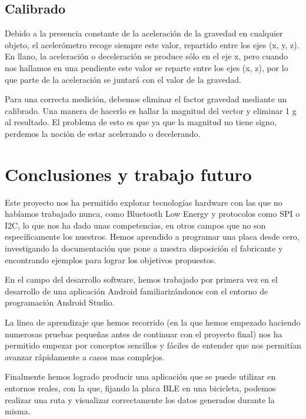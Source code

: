 

\section{Calibrado}

Debido a la presencia constante de la aceleración de la gravedad en cualquier objeto, el acelerómetro recoge siempre este valor, repartido entre los ejes (x, y, z). En llano, la aceleración o deceleración se produce sólo en el eje x, pero cuando nos hallamos en una pendiente este valor se reparte entre los ejes (x, z), por lo que parte de la aceleración se juntará con el valor de la gravedad.

Para una correcta medición, debemos eliminar el factor gravedad mediante un calibrado. Una manera de hacerlo es hallar la magnitud del vector y eliminar 1 g al resultado. El problema de esto es que ya que la magnitud no tiene signo, perdemos la noción de estar acelerando o decelerando.

\cleardoublepage

\chapter{Conclusiones y trabajo futuro}
\label{makereference8}

Este proyecto nos ha permitido explorar tecnologías hardware con las que no habíamos trabajado nunca, como Bluetooth Low Energy y protocolos como SPI o I2C, lo que nos ha dado unas competencias, en otros campos que no son específicamente los nuestros. Hemos aprendido a programar una placa desde cero, investigando la documentación que pone a nuestra disposición el fabricante y encontrando ejemplos para lograr los objetivos propuestos.

En el campo del desarrollo software, hemos trabajado por primera vez en el desarrollo de una aplicación Android familiarizándonos con el entorno de programación Android Studio.

La línea de aprendizaje que hemos recorrido (en la que hemos empezado haciendo numerosas pruebas pequeñas antes de continuar con el proyecto final) nos ha permitido empezar por conceptos sencillos y fáciles de entender que nos permitían avanzar rápidamente a casos mas complejos.

Finalmente hemos logrado producir una aplicación que se puede utilizar en entornos reales, con la que, fijando la placa BLE en una bicicleta, podemos realizar una ruta y visualizar correctamente los datos generados durante la misma.

